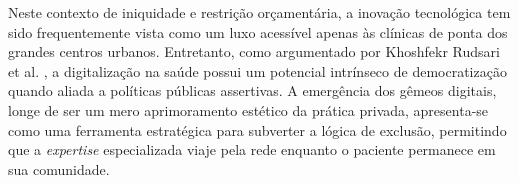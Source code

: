Neste contexto de iniquidade e restrição orçamentária, a inovação tecnológica tem sido frequentemente vista como um luxo acessível apenas às clínicas de ponta dos grandes centros urbanos. Entretanto, como argumentado por Khoshfekr Rudsari et al. \cite{khoshfekr2025digital}, a digitalização na saúde possui um potencial intrínseco de democratização quando aliada a políticas públicas assertivas. A emergência dos gêmeos digitais, longe de ser um mero aprimoramento estético da prática privada, apresenta-se como uma ferramenta estratégica para subverter a lógica de exclusão, permitindo que a \textit{expertise} especializada viaje pela rede enquanto o paciente permanece em sua comunidade.
